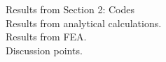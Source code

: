 %
%
%

Results from Section 2: Codes\\

Results from analytical calculations.\\

Results from FEA.\\

Discussion points.\\